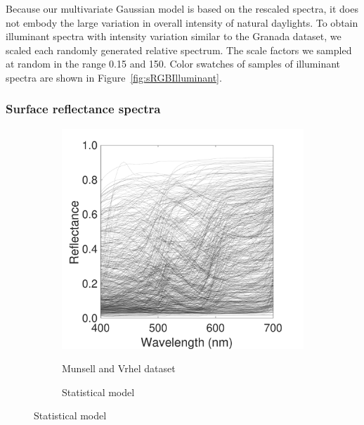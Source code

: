 \documentclass{jov}
\begin{document}
Because our multivariate Gaussian model is based on the rescaled spectra, it does not embody the large variation in overall intensity of natural daylights.
To obtain illuminant spectra with intensity variation similar to the Granada dataset, we scaled each randomly generated relative spectrum.
The scale factors we sampled at random in the range 0.15 and 150.
Color swatches of samples of illuminant spectra are shown in Figure~\ref{fig:sRGBIlluminant}.

\subsubsection{Surface reflectance spectra}
\begin{figure}
\centering
	\begin{subfigure}{0.24 \textwidth}
    \centering
            \caption{Munsell and Vrhel dataset}
        \includegraphics[width=\textwidth]{../FiguresDraft4/Figure7/Figure7_a.pdf}
        \label{fig:reflectanceSpectra}
    \end{subfigure}
    \begin{subfigure}{0.24 \textwidth}
    \centering
        \caption{Statistical model}

\end{subfigure}
\end{figure}
\end{document}
